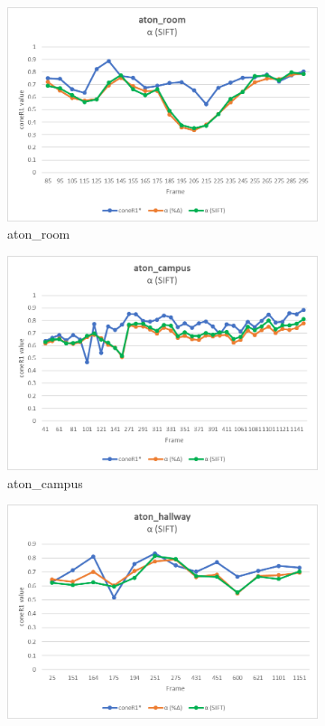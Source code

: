 \begin{appendices}
\begin{figure}
  \begin{subfigure}{.45\linewidth}
  \includegraphics[width=1\linewidth]{figures/appendix/room_sift.jpg}
  \caption{aton\_room}
\end{subfigure}
\hfill
\begin{subfigure}{.45\linewidth}
  \includegraphics[width=1\linewidth]{figures/appendix/campus_sift.jpg}
  \caption{aton\_campus}
\end{subfigure}
\hfill
\begin{subfigure}{.45\linewidth}
  \includegraphics[width=1\linewidth]{figures/appendix/hallway_sift.jpg}

\end{subfigure}
\end{figure}
\end{appendices}
